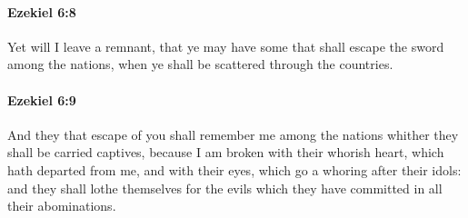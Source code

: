 		\paragraph{Ezekiel 6:8} %
			\label{EZEKIEL-6-8}

			Yet will I leave a remnant, that ye may have some that shall escape the sword among the nations, when ye shall be scattered through the countries.


		\paragraph{Ezekiel 6:9} %
			\label{EZEKIEL-6-9}

			And they that escape of you shall remember me among the nations whither they shall be carried captives, because I am broken with their whorish heart, which hath departed from me, and with their eyes, which go a whoring after their idols: and they shall lothe themselves for the evils which they have committed in all their abominations.

